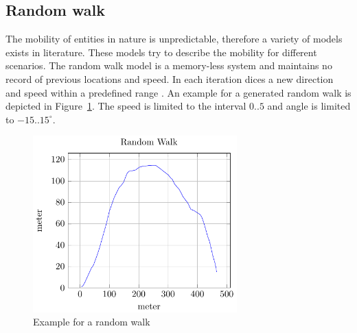 \documentclass[master,english]{hgbthesis}
\begin{document}
\subsection{Random walk}
The mobility of entities in nature is unpredictable, therefore a variety of models exists in literature. These models try to describe the mobility for different scenarios. The random walk model is a memory-less system and maintains no record of previous locations and speed. In each iteration dices a new direction and speed within a predefined range \cite{Camp2002}. An example for a generated random walk is depicted in Figure~\ref{fig:randomwalk}. The speed is limited to the interval $0..5$ and angle is limited to $-15..15^\circ$.
\begin{figure}
	\centering
	\includegraphics[width=0.7\textwidth]{./images/randomwalk}
	\caption{Example for a random walk}
	\label{fig:randomwalk}
\end{figure}
\end{document}
